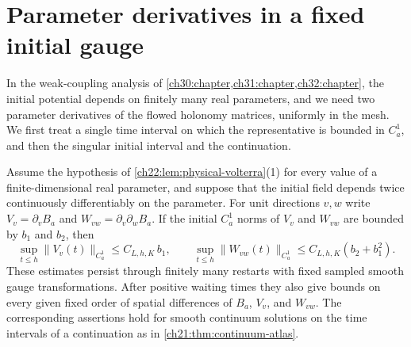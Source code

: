 \section{Parameter derivatives in a fixed initial gauge}\label{ch22:sec:parameters}

In the weak-coupling analysis of \cref{ch30:chapter,ch31:chapter,ch32:chapter}, the initial potential depends on finitely many real parameters, and we need two parameter derivatives of the flowed holonomy matrices, uniformly in the mesh. We first treat a single time interval on which the representative is bounded in $C^1_a$, and then the singular initial interval and the continuation.

\begin{lemma}\label{ch22:lem:patch-variations}
Assume the hypothesis of \cref{ch22:lem:physical-volterra}(1) for every value of a finite-dimensional real parameter, and suppose that the initial field depends twice continuously differentiably on the parameter. For unit directions $v,w$ write $V_v=\partial_vB_a$ and $W_{vw}=\partial_v\partial_wB_a$. If the initial $C_a^1$ norms of $V_v$ and $W_{vw}$ are bounded by $b_1$ and $b_2$, then
\begin{equation}\label{ch22:eq:patch-C2-bounds}
 \sup_{t\le h}\|V_v(t)\|_{C_a^1}\le C_{L,h,K}\,b_1,\qquad
 \sup_{t\le h}\|W_{vw}(t)\|_{C_a^1}\le C_{L,h,K}(b_2+b_1^2).
\end{equation}
These estimates persist through finitely many restarts with fixed sampled smooth gauge transformations. After positive waiting times they also give bounds on every given fixed order of spatial differences of $B_a$, $V_v$, and $W_{vw}$. The corresponding assertions hold for smooth continuum solutions on the time intervals of a continuation as in \cref{ch21:thm:continuum-atlas}.
\end{lemma}

